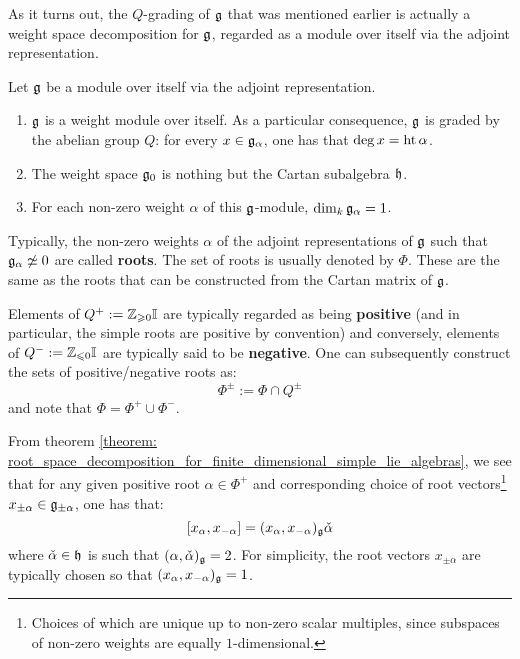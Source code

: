         As it turns out, the $Q$-grading of $\mathfrak{g}$ that was mentioned earlier is actually a weight space decomposition for $\mathfrak{g}$, regarded as a module over itself via the adjoint representation.
        \begin{theorem} \label{theorem: root_space_decomposition_for_finite_dimensional_simple_lie_algebras}
            Let $\mathfrak{g}$ be a module over itself via the adjoint representation.
            \begin{enumerate}
                \item $\mathfrak{g}$ is a weight module over itself. As a particular consequence, $\mathfrak{g}$ is graded by the abelian group $Q$: for every $x \in \mathfrak{g}_{\alpha}$, one has that $\deg x = \operatorname{ht} \alpha$.
                \item The weight space $\mathfrak{g}_0$ is nothing but the Cartan subalgebra $\mathfrak{h}$.
                \item For each non-zero weight $\alpha$ of this $\mathfrak{g}$-module, $\dim_k \mathfrak{g}_{\alpha} = 1$.
            \end{enumerate}
        \end{theorem}
        Typically, the non-zero weights $\alpha$ of the adjoint representations of $\mathfrak{g}$ such that $\mathfrak{g}_{\alpha} \not \simeq 0$ are called \textbf{roots}. The set of roots is usually denoted by $\Phi$. These are the same as the roots that can be constructed from the Cartan matrix of $\mathfrak{g}$.

        Elements of $Q^+ := \mathbb{Z}_{\geqslant 0} \mathbb{I}$ are typically regarded as being \textbf{positive} (and in particular, the simple roots are positive by convention) and conversely, elements of $Q^- := \mathbb{Z}_{\leqslant 0} \mathbb{I}$ are typically said to be \textbf{negative}. One can subsequently construct the sets of positive/negative roots as:
            $$\Phi^{\pm} := \Phi \cap Q^{\pm}$$
        and note that $\Phi = \Phi^+ \cup \Phi^-$.

        From theorem \ref{theorem: root_space_decomposition_for_finite_dimensional_simple_lie_algebras}, we see that for any given positive root $\alpha \in \Phi^+$ and corresponding choice of root vectors\footnote{Choices of which are unique up to non-zero scalar multiples, since subspaces of non-zero weights are equally $1$-dimensional.} $x_{\pm\alpha} \in \mathfrak{g}_{\pm\alpha}$, one has that:
            $$[x_{\alpha}, x_{-\alpha}] = (x_{\alpha}, x_{-\alpha})_{\mathfrak{g}} \check{\alpha}$$
        where $\check{\alpha} \in \mathfrak{h}$ is such that $(\alpha, \check{\alpha})_{\mathfrak{g}} = 2$. For simplicity, the root vectors $x_{\pm \alpha}$ are typically chosen so that $(x_{\alpha}, x_{-\alpha})_{\mathfrak{g}} = 1$.
        
